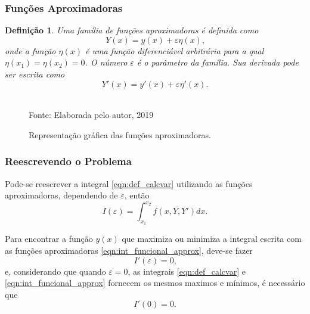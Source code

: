 \documentclass{beamer}
\newtheorem{definicao}{Definição}
\begin{document}
	\begin{frame}
		\frametitle{Funções Aproximadoras}
		\begin{definicao}
			\justify
			Uma família de funções aproximadoras é definida como
			$$Y(x)=y(x)+\varepsilon \eta (x)\text{,}$$
			onde a função $\eta (x)$ é uma função diferenciável arbitrária para a qual $\eta (x_1)=\eta (x_2)=0$. O número $\varepsilon$ é o parâmetro da família. Sua derivada pode ser escrita como
			$$Y'(x)=y'(x)+\varepsilon \eta '(x)\text{.}$$
		\end{definicao}
	\end{frame}

	\encapsulateBackgroundLessFrames
	{
		\begin{frame}
			\begin{figure}
				\caption{Representação gráfica das funções aproximadoras.}
				\begin{center}
					\resizebox{0.6\textwidth}{!}
					{
						
					}\\
					{\small Fonte: Elaborada pelo autor, 2019}
				\end{center}
				\label{fig:func_approx}
			\end{figure}
		\end{frame}
	}
	
	\begin{frame}
		\frametitle{Reescrevendo o Problema}
		\justify
	
		Pode-se reescrever a integral \eqref{eqn:def_calcvar} utilizando as funções aproximadoras, dependendo de $\varepsilon$, então
		\begin{equation}
			\label{eqn:int_funcional_approx}
			I(\varepsilon)=\int_{x_1}^{x_2}f(x, Y, Y')dx\text{.}
		\end{equation}
	
		Para encontrar a função $y(x)$ que maximiza ou minimiza a integral escrita com as funções aproximadoras \eqref{eqn:int_funcional_approx}, deve-se fazer
		$$I'(\varepsilon)=0\text{,}$$
		e, considerando que quando $\varepsilon=0$, as integrais \eqref{eqn:def_calcvar} e \eqref{eqn:int_funcional_approx} fornecem os mesmos maximos e mínimos, é necessário que
		$$I'(0)=0\text{.}$$
	\end{frame}
\end{document}
